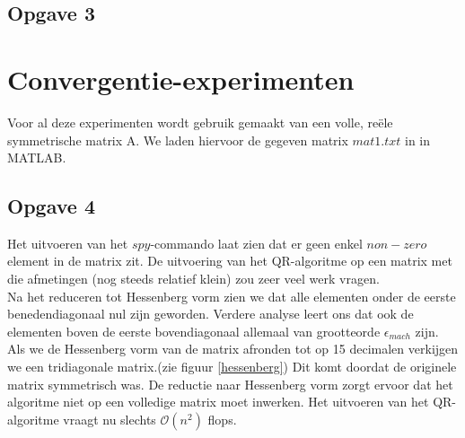 \documentclass[a4paper, 12pt, titlepage]{report}
\begin{document}
\subsection{Opgave 3}

\section{Convergentie-experimenten}
Voor al deze experimenten wordt gebruik gemaakt van een volle, re\"ele symmetrische matrix A. We laden hiervoor de gegeven matrix $mat1.txt$ in in MATLAB.

\subsection{Opgave 4}
Het uitvoeren van het $spy$-commando laat zien dat er geen enkel $non-zero$ element in de matrix zit. De uitvoering van het QR-algoritme op een matrix met die afmetingen (nog steeds relatief klein) zou zeer veel werk vragen. \\
Na het reduceren tot Hessenberg vorm zien we dat alle elementen onder de eerste benedendiagonaal nul zijn geworden. Verdere analyse leert ons dat ook de elementen boven de eerste bovendiagonaal allemaal van grootteorde $\epsilon_{mach}$ zijn. Als we de Hessenberg vorm van de matrix afronden tot op 15 decimalen verkijgen we een tridiagonale matrix.(zie figuur \ref{hessenberg}) Dit komt doordat de originele matrix symmetrisch was. De reductie naar Hessenberg vorm zorgt ervoor dat het algoritme niet op een volledige matrix moet inwerken. Het uitvoeren van het QR-algoritme vraagt nu slechts $\mathcal{O}(n^2)$ flops. 
\end{document}
